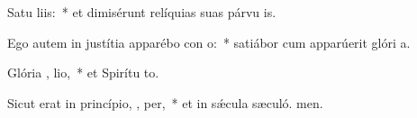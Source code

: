 \item Satu  liis:~* et dimisérunt relíquias suas párvu is.
\item Ego autem in justítia apparébo con o:~* satiábor cum apparúerit glóri a.
\item Glória ,  lio,~* et Spirítu to.
\item Sicut erat in princípio,  ,  per,~* et in sǽcula sæculó. men.
